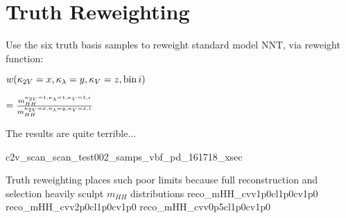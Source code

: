 \section{Truth Reweighting}

{
    Use the six truth basis samples to reweight standard model NNT,
    via reweight function:

    \vspace{5mm}

    { \tiny
    $ w(\kappa_{2V}=x,\kappa_{\lambda}=y,\kappa_{V}=z, \textrm{bin}\,i) $

    \vspace{3mm}

    $ = \frac{ m_{HH}^{\kappa_{2V}=1,\kappa_{\lambda}=1,\kappa_{V}=1,i}}{m_{HH}^{\kappa_{2V}=x,\kappa_{\lambda}=y,\kappa_{V}=z,i} }$
    }

    \vspace{5mm}

    The results are quite terrible...
}
{c2v_scan_scan_test002_samps_vbf_pd_161718_xsec}


{   
    Truth reweighting places such poor limits because 
    full reconstruction and selection heavily sculpt $m_{HH}$ distributions
}
{reco_mHH_cvv1p0cl1p0cv1p0}
{reco_mHH_cvv2p0cl1p0cv1p0}
{reco_mHH_cvv0p5cl1p0cv1p0}

